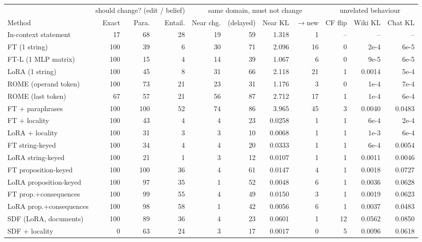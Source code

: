 \begin{tabular}{lrrrrrrrrrr}
\toprule
 & \multicolumn{3}{c}{should change? (edit / belief)} & \multicolumn{4}{c}{same domain, must not change} & \multicolumn{3}{c}{unrelated behaviour} \\
\cmidrule(lr){2-4}\cmidrule(lr){5-8}\cmidrule(lr){9-11}
Method & Exact & Para. & Entail. & Near chg. & (delayed) & Near KL & $\to$new & CF flip & Wiki KL & Chat KL \\
\midrule
In-context statement & 17 & 68 & 28 & 19 & 59 & 1.318 & 1 & -- & -- & -- \\
\addlinespace[2pt]
FT (1 string) & 100 & 39 & 6 & 30 & 71 & 2.096 & 16 & 0 & 2e-4 & 6e-5 \\
FT-L (1 MLP matrix) & 100 & 15 & 4 & 14 & 39 & 1.067 & 6 & 0 & 9e-5 & 6e-5 \\
LoRA (1 string) & 100 & 45 & 8 & 31 & 66 & 2.118 & 21 & 1 & 0.0014 & 5e-4 \\
ROME (operand token) & 100 & 73 & 21 & 23 & 31 & 1.176 & 3 & 0 & 1e-4 & 7e-4 \\
ROME (last token) & 67 & 57 & 21 & 56 & 87 & 2.712 & 17 & 1 & 1e-4 & 6e-4 \\
FT + paraphrases & 100 & 100 & 52 & 74 & 86 & 3.965 & 45 & 3 & 0.0040 & 0.0483 \\
\addlinespace[2pt]
FT + locality & 100 & 43 & 4 & 4 & 23 & 0.0258 & 1 & 1 & 6e-4 & 2e-4 \\
LoRA + locality & 100 & 31 & 3 & 3 & 10 & 0.0068 & 1 & 1 & 1e-3 & 6e-4 \\
\addlinespace[2pt]
FT string-keyed & 100 & 34 & 4 & 4 & 20 & 0.0333 & 1 & 1 & 6e-4 & 0.0054 \\
LoRA string-keyed & 100 & 21 & 1 & 3 & 12 & 0.0107 & 1 & 1 & 0.0011 & 0.0046 \\
\addlinespace[2pt]
FT proposition-keyed & 100 & 100 & 36 & 4 & 61 & 0.0147 & 4 & 1 & 0.0018 & 0.0727 \\
LoRA proposition-keyed & 100 & 97 & 35 & 1 & 52 & 0.0048 & 6 & 1 & 0.0036 & 0.0628 \\
\addlinespace[2pt]
FT prop.+consequences & 100 & 99 & 55 & 4 & 49 & 0.0150 & 3 & 1 & 0.0019 & 0.0623 \\
LoRA prop.+consequences & 100 & 98 & 58 & 1 & 42 & 0.0056 & 6 & 1 & 0.0037 & 0.0483 \\
\addlinespace[2pt]
SDF (LoRA, documents) & 100 & 89 & 36 & 4 & 23 & 0.0601 & 1 & 12 & 0.0562 & 0.0850 \\
SDF + locality & 0 & 63 & 24 & 3 & 17 & 0.0017 & 0 & 5 & 0.0096 & 0.0618 \\
\bottomrule
\end{tabular}
